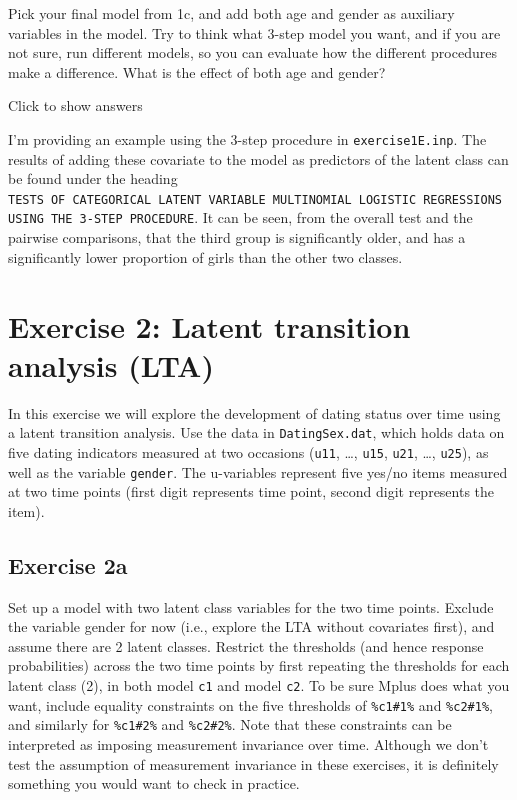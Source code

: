 \documentclass[
]{book}
\begin{document}
Pick your final model from 1c, and add both age and gender as auxiliary variables in the model. Try to think what 3-step model you want, and if you are not sure, run different models, so you can evaluate how the different procedures make a difference. What is the effect of both age and gender?

Click to show answers

I'm providing an example using the 3-step procedure in \texttt{exercise1E.inp}. The results of adding these covariate to the model as predictors of the latent class can be found under the heading \texttt{TESTS\ OF\ CATEGORICAL\ LATENT\ VARIABLE\ MULTINOMIAL\ LOGISTIC\ REGRESSIONS\ USING\ THE\ 3-STEP\ PROCEDURE}. It can be seen, from the overall test and the pairwise comparisons, that the third group is significantly older, and has a significantly lower proportion of girls than the other two classes.

\hypertarget{exercise-2-latent-transition-analysis-lta}{%
\section{Exercise 2: Latent transition analysis (LTA)}\label{exercise-2-latent-transition-analysis-lta}}

In this exercise we will explore the development of dating status over time using a latent transition analysis. Use the data in \texttt{DatingSex.dat}, which holds data on five dating indicators measured at two occasions (\texttt{u11}, \ldots, \texttt{u15}, \texttt{u21}, \ldots, \texttt{u25}), as well as the variable \texttt{gender}. The u-variables represent five yes/no items measured at two time points (first digit represents time point, second digit represents the item).

\hypertarget{exercise-2a}{%
\subsection{Exercise 2a}\label{exercise-2a}}

Set up a model with two latent class variables for the two time points. Exclude the variable gender for now (i.e., explore the LTA without covariates first), and assume there are 2 latent classes. Restrict the thresholds (and hence response probabilities) across the two time points by first repeating the thresholds for each latent class (2), in both model \texttt{c1} and model \texttt{c2}. To be sure Mplus does what you want, include equality constraints on the five thresholds of \texttt{\%c1\#1\%} and \texttt{\%c2\#1\%}, and similarly for \texttt{\%c1\#2\%} and \texttt{\%c2\#2\%}. Note that these constraints can be interpreted as imposing measurement invariance over time. Although we don't test the assumption of measurement invariance in these exercises, it is definitely something you would want to check in practice.
\end{document}
